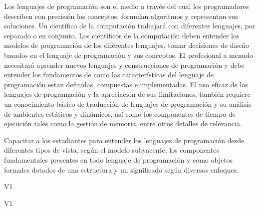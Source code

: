 \begin{syllabus}


\begin{justification}
Los lenguajes de programación son el medio a través del cual los programadores describen con precisión los conceptos, 
formulan algoritmos y representan sus soluciones. Un científico de la computación trabajará con diferentes lenguajes, 
por separado o en conjunto. Los científicos de la computación deben entender los modelos de programación de los diferentes 
lenguajes, tomar decisiones de diseño basados en el lenguaje de programación y sus conceptos. El profesional a menudo 
necesitará aprender nuevos lenguajes y construcciones de programación y debe entender los fundamentos de como las 
características del lenguaje de programación estan definidas, compuestas e implementadas. El uso eficaz de los lenguajes 
de programación y la apreciación de sus limitaciones, también requiere un conocimiento básico de traducción de lenguajes 
de programación y su análisis de ambientes estáticos y dinámicos, así como los componentes de tiempo de ejecución tales 
como la gestión de memoria, entre otros detalles de relevancia.
\end{justification}

\begin{goals}
\item Capacitar a los estudiantes para entender los lenguajes de programación desde diferentes tipos de vista, según el 
modelo subyacente, los componentes fundamentales presentes en todo lenguaje de programación y como objetos formales 
dotados de una estructura y un significado según diversos enfoques.
\end{goals}

\begin{outcomes}{V1}
    \item {}
    \item {}
    \item {} 
    \item {} 
		
\end{outcomes}

\begin{competences}{V1}
    \item {} 
    \item {}
    \item {}
    \item {}
    \item {}
\end{competences}


\end{syllabus}
